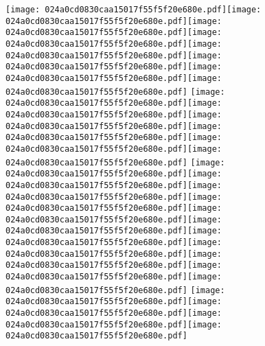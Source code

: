 \documentclass{article}
\newcommand{\origpg}[2]{\texttt{[image: 024a0cd0830caa15017f55f5f20e680e.pdf]}}
\begin{document}
{\vspace{32.762pt}\hspace{71.112pt}\origpg1{156.41pt 553.76pt 170.17pt 573.75pt}\origpg1{170.17pt 553.76pt 181.69pt 573.75pt}\origpg1{181.69pt 553.76pt 193.2pt 573.75pt}\origpg1{193.24pt 553.76pt 203.24pt 573.75pt}\origpg1{203.34pt 553.76pt 216.96pt 573.75pt}\origpg1{217.06pt 553.76pt 228.58pt 573.75pt}\origpg1{228.58pt 553.76pt 240.09pt 573.75pt}\hspace{-0.14pt}\origpg1{239.95pt 553.76pt 249.95pt 573.75pt} \origpg1{255.09pt 553.76pt 268.7pt 573.75pt}\hspace{-0.36pt}\origpg1{268.34pt 553.76pt 278.34pt 573.75pt}\hspace{-0.36pt}\origpg1{277.98pt 553.76pt 288.1pt 573.75pt}\origpg1{288.1pt 553.76pt 296.98pt 573.75pt}\origpg1{296.98pt 553.76pt 308.19pt 573.75pt}\hspace{0.12pt}\origpg1{308.31pt 553.76pt 319.83pt 573.75pt} \origpg1{324.91pt 553.76pt 336.03pt 573.75pt}\origpg1{336.03pt 553.76pt 344.9pt 573.75pt}\hspace{-0.24pt}\origpg1{344.66pt 553.76pt 361.54pt 573.75pt}\hspace{0.2pt}\origpg1{361.74pt 553.76pt 370.62pt 573.75pt}\hspace{-0.2pt}\origpg1{370.42pt 553.76pt 380.23pt 573.75pt}\origpg1{380.24pt 553.76pt 390.23pt 573.75pt}\hspace{-0.3pt}\origpg1{389.93pt 553.76pt 401.21pt 573.75pt}\hspace{-0.2pt}\origpg1{401.01pt 553.76pt 412.53pt 573.75pt}\origpg1{412.53pt 553.76pt 148.5mm 573.75pt}\hspace{0.14pt}\origpg1{422.66pt 553.76pt 431.74pt 573.75pt}\hspace{-0.4pt}\origpg1{431.34pt 553.76pt 441.34pt 573.75pt} \origpg1{446.48pt 553.76pt 455.56pt 573.75pt}\hspace{-0.16pt}\origpg1{455.4pt 553.76pt 465.39pt 573.75pt}\origpg1{465.49pt 553.76pt 473.53pt 573.75pt}\origpg1{473.45pt 553.76pt 483.45pt 573.75pt} 

\vspace{33.033pt}\hspace{234.73pt} 

}
\end{document}
